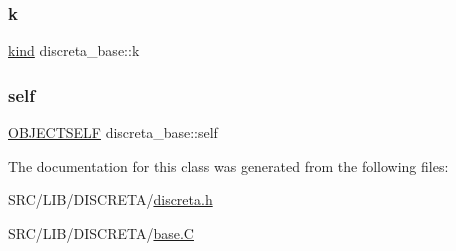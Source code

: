 \subsubsection{\texorpdfstring{k}{k}}
{\footnotesize\ttfamily \mbox{\hyperlink{discreta_8h_aaf25ee7e2306d78c74ec7bc48f092e81}{kind}} discreta\+\_\+base\+::k}

\mbox{\label{classdiscreta__base_a46d2effc12a280b39ac6b2f940a3abf0}} 
\subsubsection{\texorpdfstring{self}{self}}
{\footnotesize\ttfamily \mbox{\hyperlink{union_o_b_j_e_c_t_s_e_l_f}{O\+B\+J\+E\+C\+T\+S\+E\+LF}} discreta\+\_\+base\+::self}



The documentation for this class was generated from the following files\+:\begin{DoxyCompactItemize}
\item 
S\+R\+C/\+L\+I\+B/\+D\+I\+S\+C\+R\+E\+T\+A/\mbox{\hyperlink{discreta_8h}{discreta.\+h}}\item 
S\+R\+C/\+L\+I\+B/\+D\+I\+S\+C\+R\+E\+T\+A/\mbox{\hyperlink{base_8_c}{base.\+C}}\end{DoxyCompactItemize}
